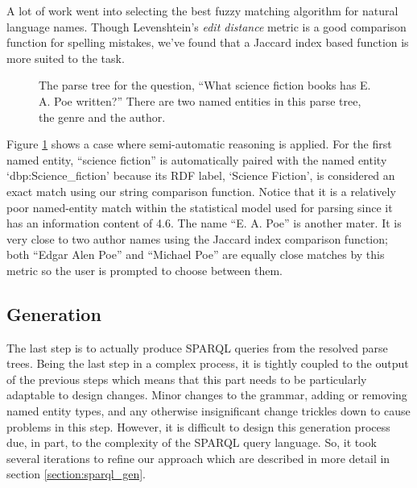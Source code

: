 \documentclass[11pt]{article}
\begin{document}
{A lot of work went into selecting the best fuzzy matching algorithm for
natural language names. Though Levenshtein's {\em edit distance} metric
is a good comparison function for spelling mistakes, we've found that
a Jaccard index based function is more suited to the task. 

\begin{figure}[h!]
\caption{The parse tree for the question, 
``What science fiction books has E. A. Poe written?''
There are two named entities in this parse tree, the genre and the author.}
\label{fig:resolve}
\end{figure}

Figure \ref{fig:resolve} shows a case where semi-automatic reasoning is applied.
For the first named entity, ``science fiction'' is automatically paired with the
named entity `dbp:Science\_fiction' because its RDF label, `Science Fiction', is 
considered an exact match using our string comparison function. 
Notice that it is a relatively poor named-entity match within the statistical model
used for parsing since it has an information content of 4.6. 
The name ``E. A. Poe'' is another mater. It is
very close to two author names using the Jaccard index comparison function; both
``Edgar Alen Poe'' and ``Michael Poe'' are equally close matches by this metric so the
user is prompted to choose between them.

\subsection{Generation}
\label{gen}
The last step is to actually produce SPARQL queries from the resolved parse trees.
Being the last step in a complex process, it is tightly coupled to the output of the
previous steps which means that this part needs to be particularly adaptable to design
changes. Minor changes to the grammar, adding or removing named entity types, and
any otherwise insignificant change trickles down to cause problems in this step.
However, it is difficult to design this generation process due, in part, 
to the complexity of the SPARQL query language. 
So, it took several iterations to refine our approach which are described
in more detail in section \ref{section:sparql_gen}.


}
\end{document}
